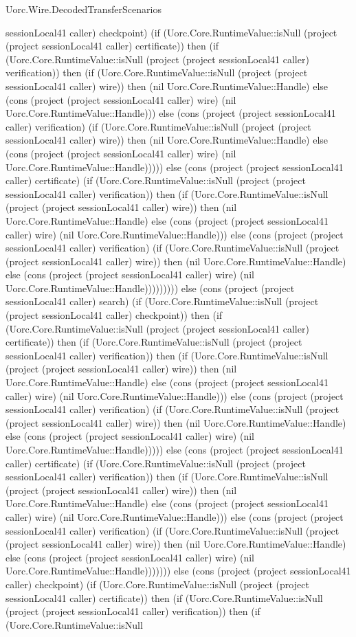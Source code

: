 \begin{lexlean}{Uorc.Wire.DecodedTransferScenarios}
\begin{semanticmodule}
{sessionLocal41 caller) checkpoint) (if (Uorc.Core.RuntimeValue::isNull (project (project sessionLocal41 caller) certificate)) then (if (Uorc.Core.RuntimeValue::isNull (project (project sessionLocal41 caller) verification)) then (if (Uorc.Core.RuntimeValue::isNull (project (project sessionLocal41 caller) wire)) then (nil Uorc.Core.RuntimeValue::Handle) else (cons (project (project sessionLocal41 caller) wire) (nil Uorc.Core.RuntimeValue::Handle))) else (cons (project (project sessionLocal41 caller) verification) (if (Uorc.Core.RuntimeValue::isNull (project (project sessionLocal41 caller) wire)) then (nil Uorc.Core.RuntimeValue::Handle) else (cons (project (project sessionLocal41 caller) wire) (nil Uorc.Core.RuntimeValue::Handle))))) else (cons (project (project sessionLocal41 caller) certificate) (if (Uorc.Core.RuntimeValue::isNull (project (project sessionLocal41 caller) verification)) then (if (Uorc.Core.RuntimeValue::isNull (project (project sessionLocal41 caller) wire)) then (nil Uorc.Core.RuntimeValue::Handle) else (cons (project (project sessionLocal41 caller) wire) (nil Uorc.Core.RuntimeValue::Handle))) else (cons (project (project sessionLocal41 caller) verification) (if (Uorc.Core.RuntimeValue::isNull (project (project sessionLocal41 caller) wire)) then (nil Uorc.Core.RuntimeValue::Handle) else (cons (project (project sessionLocal41 caller) wire) (nil Uorc.Core.RuntimeValue::Handle))))))))) else (cons (project (project sessionLocal41 caller) search) (if (Uorc.Core.RuntimeValue::isNull (project (project sessionLocal41 caller) checkpoint)) then (if (Uorc.Core.RuntimeValue::isNull (project (project sessionLocal41 caller) certificate)) then (if (Uorc.Core.RuntimeValue::isNull (project (project sessionLocal41 caller) verification)) then (if (Uorc.Core.RuntimeValue::isNull (project (project sessionLocal41 caller) wire)) then (nil Uorc.Core.RuntimeValue::Handle) else (cons (project (project sessionLocal41 caller) wire) (nil Uorc.Core.RuntimeValue::Handle))) else (cons (project (project sessionLocal41 caller) verification) (if (Uorc.Core.RuntimeValue::isNull (project (project sessionLocal41 caller) wire)) then (nil Uorc.Core.RuntimeValue::Handle) else (cons (project (project sessionLocal41 caller) wire) (nil Uorc.Core.RuntimeValue::Handle))))) else (cons (project (project sessionLocal41 caller) certificate) (if (Uorc.Core.RuntimeValue::isNull (project (project sessionLocal41 caller) verification)) then (if (Uorc.Core.RuntimeValue::isNull (project (project sessionLocal41 caller) wire)) then (nil Uorc.Core.RuntimeValue::Handle) else (cons (project (project sessionLocal41 caller) wire) (nil Uorc.Core.RuntimeValue::Handle))) else (cons (project (project sessionLocal41 caller) verification) (if (Uorc.Core.RuntimeValue::isNull (project (project sessionLocal41 caller) wire)) then (nil Uorc.Core.RuntimeValue::Handle) else (cons (project (project sessionLocal41 caller) wire) (nil Uorc.Core.RuntimeValue::Handle))))))) else (cons (project (project sessionLocal41 caller) checkpoint) (if (Uorc.Core.RuntimeValue::isNull (project (project sessionLocal41 caller) certificate)) then (if (Uorc.Core.RuntimeValue::isNull (project (project sessionLocal41 caller) verification)) then (if (Uorc.Core.RuntimeValue::isNull }
\end{semanticmodule}
\end{lexlean}
